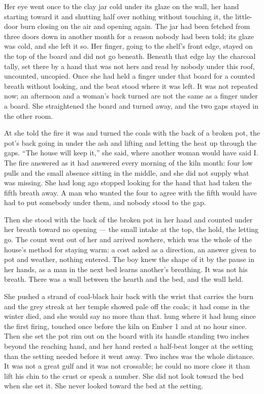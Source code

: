 Her eye went once to the clay jar cold under its glaze on the wall, her hand starting toward it and shutting half over nothing without touching it, the little-door burn closing on the air and opening again. The jar had been fetched from three doors down in another month for a reason nobody had been told; its glaze was cold, and she left it so. Her finger, going to the shelf's front edge, stayed on the top of the board and did not go beneath. Beneath that edge lay the charcoal tally, set there by a hand that was not hers and read by nobody under this roof, uncounted, uncopied. Once she had held a finger under that board for a counted breath without looking, and the beat stood where it was left. It was not repeated now; an afternoon and a woman's back turned are not the same as a finger under a board. She straightened the board and turned away, and the two gaps stayed in the other room.

\scenebreak

At  she told the fire it was  and turned the coals with the back of a broken pot, the pot's back going in under the ash and lifting and letting the heat up through the gaps. “The house will keep it,” she said, where another woman would have said I. The fire answered as it had answered every morning of the kiln month: four low pulls and the small absence sitting in the middle, and she did not supply what was missing. She had long ago stopped looking for the hand that had taken the fifth breath away. A man who wanted the four to agree with the fifth would have had to put somebody under them, and nobody stood to the gap.

Then she stood with the back of the broken pot in her hand and counted under her breath toward no opening --- the small intake at the top, the hold, the letting go. The count went out of her and arrived nowhere, which was the whole of the house's method for staying warm: a cost asked as a direction, an answer given to pot and weather, nothing entered. The boy knew the shape of it by the pause in her hands, as a man in the next bed learns another's breathing. It was not his breath. There was a wall between the hearth and the bed, and the wall held.

She pushed a strand of coal-black hair back with the wrist that carries the burn and the grey streak at her temple showed pale off the coals; it had come in the winter  died, and she would say no more than that.  hung where it had hung since the first firing, touched once before the kiln on Ember 1 and at no hour since. Then she set the pot rim out on the board with its handle standing two inches beyond the reaching hand, and her hand rested a half-beat longer at the setting than the setting needed before it went away. Two inches was the whole distance. It was not a great gulf and it was not crossable; he could no more close it than lift his chin to the crust or speak a number. She did not look toward the bed when she set it. She never looked toward the bed at the setting.

